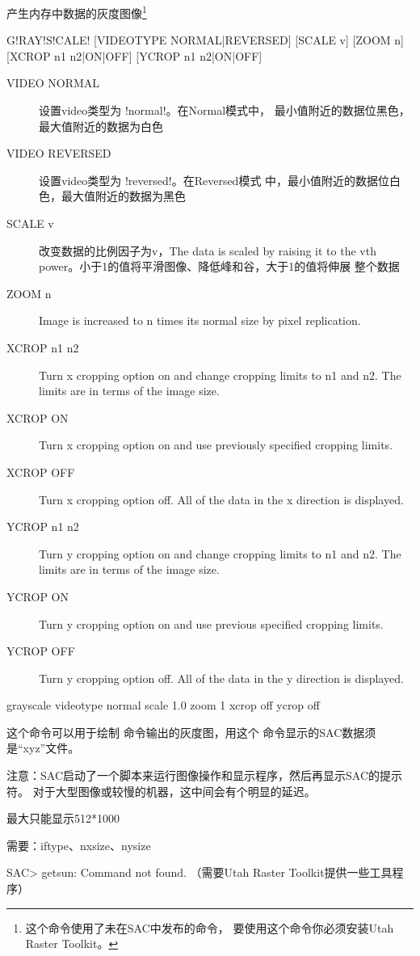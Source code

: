 \label{cmd:grayscale}

产生内存中数据的灰度图像\footnote{这个命令使用了未在SAC中发布的命令，
    要使用这个命令你必须安装Utah Raster Toolkit。}

\begin{SACSTX}
G!RAY!S!CALE! [VIDEOTYPE NORMAL|REVERSED] [SCALE v] [ZOOM n]
    [XCROP n1 n2|ON|OFF] [YCROP n1 n2|ON|OFF]
\end{SACSTX}

\begin{description}
\item [VIDEO NORMAL] 设置video类型为 !normal!。在Normal模式中，
    最小值附近的数据位黑色，最大值附近的数据为白色
\item [VIDEO REVERSED] 设置video类型为 !reversed!。在Reversed模式
    中，最小值附近的数据位白色，最大值附近的数据为黑色
\item [SCALE v] 改变数据的比例因子为v，The data is scaled by raising it
    to the vth power。小于1的值将平滑图像、降低峰和谷，大于1的值将伸展
    整个数据
\item [ZOOM n] Image is increased to n times its normal size by pixel replication.
\item [XCROP n1 n2] Turn x cropping option on and change cropping limits
    to n1 and n2. The limits are in terms of the image size.
\item [XCROP ON] Turn x cropping option on and use previously specified cropping limits.
\item [XCROP OFF] Turn x cropping option off.  All of the data in the x direction is displayed.
\item [YCROP n1 n2] Turn y cropping option on and change cropping limits to n1 and n2. The limits are in terms of the image size.
\item [YCROP ON] Turn y cropping option on and use previous specified cropping limits.
\item [YCROP OFF] Turn y cropping option off.  All of the data in the y direction is displayed.
\end{description}

\begin{SACDFT}
grayscale videotype normal scale 1.0 zoom 1 xcrop off ycrop off
\end{SACDFT}

这个命令可以用于绘制  命令输出的灰度图，用这个
命令显示的SAC数据须是``xyz''文件。

注意：SAC启动了一个脚本来运行图像操作和显示程序，然后再显示SAC的提示符。
对于大型图像或较慢的机器，这中间会有个明显的延迟。

最大只能显示512*1000

需要：iftype、nxsize、nysize

SAC> getsun: Command not found.  （需要Utah Raster Toolkit提供一些工具程序）

